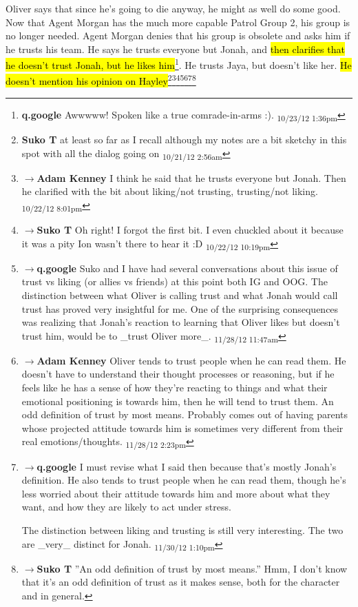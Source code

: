 Oliver says that since he's going to die anyway, he might as well do some good.  Now that Agent Morgan has the much more capable Patrol Group 2, his group is no longer needed.  Agent Morgan denies that his group is obsolete and asks him if he trusts his team.  He says he trusts everyone but Jonah, and \hl{then clarifies that he doesn't trust Jonah, but he likes him}\footnote{\textbf{q.google }Awwwww!  Spoken like a true comrade-in-arms :). \textsubscript{10/23/12 1:36pm}}.  He trusts Jaya, but doesn't like her.  \hl{He doesn't mention his opinion on Hayley}\footnote{\textbf{Suko T }at least so far as I recall although my notes are a bit sketchy in this spot with all the dialog going on \textsubscript{10/21/12 2:56am}}\footnote{$\rightarrow$\textbf{Adam Kenney }I think he said that he trusts everyone but Jonah.  Then he clarified with the bit about liking/not trusting, trusting/not liking. \textsubscript{10/22/12 8:01pm}}\footnote{$\rightarrow$\textbf{Suko T }Oh right!  I forgot the first bit.  I even chuckled about it because it was a pity Ion wasn't there to hear it :D \textsubscript{10/22/12 10:19pm}}\footnote{$\rightarrow$\textbf{q.google }Suko and I have had several conversations about this issue of trust vs liking (or allies vs friends) at this point both IG and OOG.  The distinction between what Oliver is calling trust and what Jonah would call trust has proved very insightful for me.  One of the surprising consequences was realizing that Jonah's reaction to learning that Oliver likes but doesn't trust him, would be to \_trust Oliver more\_. \textsubscript{11/28/12 11:47am}}\footnote{$\rightarrow$\textbf{Adam Kenney }Oliver tends to trust people when he can read them.  He doesn't have to understand their thought processes or reasoning, but if he feels like he has a sense of how they're reacting to things and what their emotional positioning is towards him, then he will tend to trust them.  An odd definition of trust by most means.  Probably comes out of having parents whose projected attitude towards him is sometimes very different from their real emotions/thoughts. \textsubscript{11/28/12 2:23pm}}\footnote{$\rightarrow$\textbf{q.google }I must revise what I said then because that's mostly Jonah's definition.  He also tends to trust people when he can read them, though he's less worried about their attitude towards him and more about what they want, and how they are likely to act under stress.

The distinction between liking and trusting is still very interesting.  The two are \_very\_ distinct for Jonah. \textsubscript{11/30/12 1:10pm}}\footnote{$\rightarrow$\textbf{Suko T }''An odd definition of trust by most means.''
Hmm, I don't know that it's an odd definition of trust as it makes sense, both for the character and in general.

}
